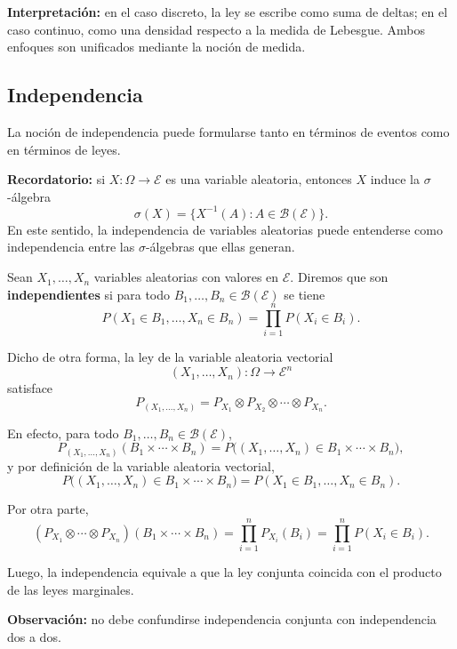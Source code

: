 \medskip

\noindent
\textbf{Interpretación:} en el caso discreto, la ley se escribe como suma de deltas; en el caso continuo, como una densidad respecto a la medida de Lebesgue. Ambos enfoques son unificados mediante la noción de medida.

\subsection{Independencia}

La noción de independencia puede formularse tanto en términos de eventos como en términos de leyes.

\medskip

\noindent
\textbf{Recordatorio:} si $X:\Omega \to \mathcal{E}$ es una variable aleatoria, entonces $X$ induce la $\sigma$-álgebra
\[
\sigma(X)=\{X^{-1}(A):A\in\mathcal{B}(\mathcal{E})\}.
\]
En este sentido, la independencia de variables aleatorias puede entenderse como independencia entre las $\sigma$-álgebras que ellas generan.

\begin{defi}
Sean $X_1,\dots,X_n$ variables aleatorias con valores en $\mathcal{E}$. Diremos que son \textbf{independientes} si para todo $B_1,\dots,B_n \in \mathcal{B}(\mathcal{E})$ se tiene
\[
P(X_1\in B_1,\dots,X_n\in B_n)
=
\prod_{i=1}^{n} P(X_i\in B_i).
\]
\end{defi}

\noindent
Dicho de otra forma, la ley de la variable aleatoria vectorial
\[
(X_1,\dots,X_n):\Omega\to \mathcal{E}^n
\]
satisface
\[
P_{(X_1,\dots,X_n)}
=
P_{X_1}\otimes P_{X_2}\otimes\cdots\otimes P_{X_n}.
\]

En efecto, para todo $B_1,\dots,B_n\in\mathcal{B}(\mathcal{E})$,
\[
P_{(X_1,\dots,X_n)}(B_1\times\cdots\times B_n)
=
P\big((X_1,\dots,X_n)\in B_1\times\cdots\times B_n\big),
\]
y por definición de la variable aleatoria vectorial,
\[
P\big((X_1,\dots,X_n)\in B_1\times\cdots\times B_n\big)
=
P(X_1\in B_1,\dots,X_n\in B_n).
\]

Por otra parte,
\[
(P_{X_1}\otimes\cdots\otimes P_{X_n})(B_1\times\cdots\times B_n)
=
\prod_{i=1}^n P_{X_i}(B_i)
=
\prod_{i=1}^n P(X_i\in B_i).
\]

Luego, la independencia equivale a que la ley conjunta coincida con el producto de las leyes marginales.

\medskip

\noindent
\textbf{Observación:} no debe confundirse independencia conjunta con independencia dos a dos.

